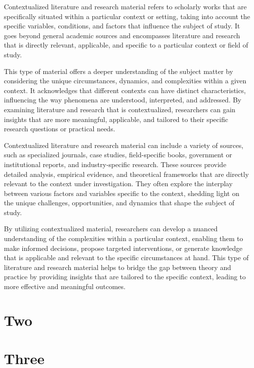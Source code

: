 \begin{spacing}{2.0}
Contextualized literature and research material refers to scholarly works that are specifically situated within a particular context or setting, taking into account the specific variables, conditions, and factors that influence the subject of study. It goes beyond general academic sources and encompasses literature and research that is directly relevant, applicable, and specific to a particular context or field of study.

This type of material offers a deeper understanding of the subject matter by considering the unique circumstances, dynamics, and complexities within a given context. It acknowledges that different contexts can have distinct characteristics, influencing the way phenomena are understood, interpreted, and addressed. By examining literature and research that is contextualized, researchers can gain insights that are more meaningful, applicable, and tailored to their specific research questions or practical needs.

Contextualized literature and research material can include a variety of sources, such as specialized journals, case studies, field-specific books, government or institutional reports, and industry-specific research. These sources provide detailed analysis, empirical evidence, and theoretical frameworks that are directly relevant to the context under investigation. They often explore the interplay between various factors and variables specific to the context, shedding light on the unique challenges, opportunities, and dynamics that shape the subject of study.

By utilizing contextualized material, researchers can develop a nuanced understanding of the complexities within a particular context, enabling them to make informed decisions, propose targeted interventions, or generate knowledge that is applicable and relevant to the specific circumstances at hand. This type of literature and research material helps to bridge the gap between theory and practice by providing insights that are tailored to the specific context, leading to more effective and meaningful outcomes.

\section{Two}


\section{Three}


\end{spacing}
\newpage
